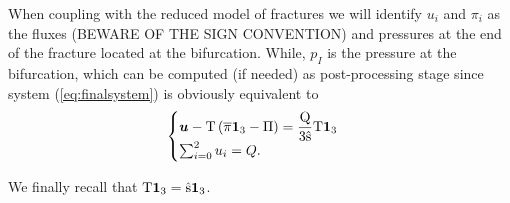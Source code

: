 \documentclass[11pt,a4paper,twoside]{article}
\newcommand{\flux}{\ensuremath{u}}
\newcommand{\pressure}{\ensuremath{p}}
\newcommand{\edgepressure}{\ensuremath{\pi}}
\newcommand{\trans}{\ensuremath{\rm T}}
\newcommand{\fluxvector}{\ensuremath{\boldsymbol{u}}}
\newcommand{\intsource}{\ensuremath{Q}}
\begin{document}
When coupling with the reduced model of fractures we will identify 
$\flux_i$ and $\edgepressure_i$ as the fluxes (BEWARE OF THE SIGN CONVENTION)
and pressures at the end of the fracture located at the bifurcation. While,
$\pressure_I$ is the pressure at the bifurcation, which can be computed (if needed) as post-processing stage since system (\ref{eq:finalsystem}) is obviously equivalent to
\begin{equation}
\label{eq:finalsystem2}
\begin{cases}
\fluxvector-\trans\left(\overline{\edgepressure} \boldsymbol{1}_3-\Pi\right)=\dfrac{\intsource}{3\hat{s}}\trans\boldsymbol{1}_3\\
\sum_{i=0}^2 \flux_i=\intsource.
\end{cases}
\end{equation}

We finally recall that $\trans\boldsymbol{1}_3=\hat{s}\boldsymbol{1}_3$.



\end{document}
